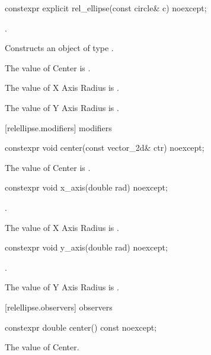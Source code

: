 \begin{itemdecl}
constexpr explicit rel_ellipse(const circle& c) noexcept;
\end{itemdecl}
\begin{itemdescr}
\pnum
\requires
{}.

\pnum
\effects
Constructs an object of type .

\pnum
The value of Center is .

\pnum
The value of X Axis Radius is .

\pnum
The value of Y Axis Radius is .
\end{itemdescr}

 [relellipse.modifiers]{ modifiers}

\begin{itemdecl}
constexpr void center(const vector_2d& ctr) noexcept;
\end{itemdecl}

\begin{itemdescr}
\pnum
\effects
The value of Center is .
\end{itemdescr}

\begin{itemdecl}
constexpr void x_axis(double rad) noexcept;
\end{itemdecl}
\begin{itemdescr}
\requires
{}.

\pnum
\effects
The value of X Axis Radius is .
\end{itemdescr}

\begin{itemdecl}
constexpr void y_axis(double rad) noexcept;
\end{itemdecl}
\begin{itemdescr}
\requires
{}.

\pnum
\effects
The value of Y Axis Radius is .
\end{itemdescr}

 [relellipse.observers]{ observers}

\begin{itemdecl}
constexpr double center() const noexcept;
\end{itemdecl}
\begin{itemdescr}
\pnum
\returns
The value of Center.
\end{itemdescr}

